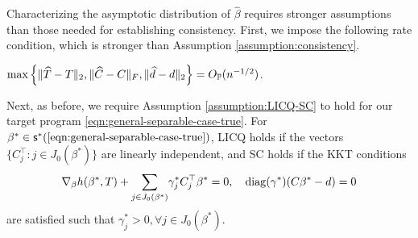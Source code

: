 Characterizing the asymptotic distribution of $\widehat{\beta}$ requires stronger assumptions than those needed for establishing consistency. First, we impose the following rate condition, which is stronger than Assumption \ref{assumption:consistency}.
\begin{assumption}\label{assumption:root-n-rates}
    $\max\left\{ \Vert \widehat{T} - T \Vert_2, \Vert \widehat{C} - C \Vert_F, \Vert \widehat{d} - d \Vert_2 \right\} = O_{\mathbb{P}}(n^{-1/2})$.
\end{assumption}
Next, as before, we require Assumption \ref{assumption:LICQ-SC} to hold for our target program \ref{eqn:general-separable-case-true}. For $\beta^* \in \mathsf{s}^*({\text{\ref{eqn:general-separable-case-true}}})$, LICQ holds if the vectors $\{C_j^\top: j \in J_0(\beta^*)\}$ are linearly independent, and SC holds if the KKT conditions
\begin{align*}
    \nabla_{\beta} h(\beta^*, T) + \underset{j \in J_0(\beta^*)}{\sum}{\gamma}^*_j  C_j^\top\beta^* = 0, \quad \operatorname{diag}({\gamma}^*)(C\beta^* - d) = 0
\end{align*}
are satisfied such that
$
    {\gamma}^*_j > 0, \forall j \in J_0(\beta^*).
$    


